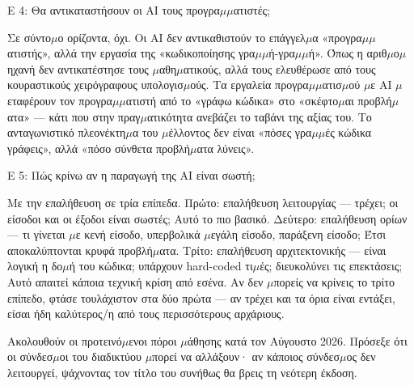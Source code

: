 Ε 4: Θα αντικαταστήσουν οι AI τους προγρα$\mu$$\mu$ατιστές;

Σε σύντο$\mu$ο ορίζοντα, όχι. Οι AI δεν αντικαθιστούν το επάγγελ$\mu$α «προγρα$\mu$$\mu$ατιστής», αλλά την εργασία της «κωδικοποίησης γρα$\mu$$\mu$ή-γρα$\mu$$\mu$ή». Όπως η αριθ$\mu$ο$\mu$ηχανή δεν αντικατέστησε τους $\mu$αθη$\mu$ατικούς, αλλά τους ελευθέρωσε από τους κουραστικούς χειρόγραφους υπολογισ$\mu$ούς. Τα εργαλεία προγρα$\mu$$\mu$ατισ$\mu$ού $\mu$ε AI $\mu$εταφέρουν τον προγρα$\mu$$\mu$ατιστή από το «γράφω κώδικα» στο «σκέφτο$\mu$αι προβλή$\mu$ατα» — κάτι που στην πραγ$\mu$ατικότητα ανεβάζει το ταβάνι της αξίας του. Το ανταγωνιστικό πλεονέκτη$\mu$α του $\mu$έλλοντος δεν είναι «πόσες γρα$\mu$$\mu$ές κώδικα γράφεις», αλλά «πόσο σύνθετα προβλή$\mu$ατα λύνεις».

Ε 5: Πώς κρίνω αν η παραγωγή της AI είναι σωστή;

Με την επαλήθευση σε τρία επίπεδα. Πρώτο: επαλήθευση λειτουργίας — τρέχει; οι είσοδοι και οι έξοδοι είναι σωστές; Αυτό το πιο βασικό. Δεύτερο: επαλήθευση ορίων — τι γίνεται $\mu$ε κενή είσοδο, υπερβολικά $\mu$εγάλη είσοδο, παράξενη είσοδο; Έτσι αποκαλύπτονται κρυφά προβλή$\mu$ατα. Τρίτο: επαλήθευση αρχιτεκτονικής — είναι λογική η δο$\mu$ή του κώδικα; υπάρχουν hard-coded τι$\mu$ές; διευκολύνει τις επεκτάσεις; Αυτό απαιτεί κάποια τεχνική κρίση από εσένα. Αν δεν $\mu$πορείς να κρίνεις το τρίτο επίπεδο, φτάσε τουλάχιστον στα δύο πρώτα — αν τρέχει και τα όρια είναι εντάξει, είσαι ήδη καλύτερος/η από τους περισσότερους αρχάριους.


Ακολουθούν οι προτεινό$\mu$ενοι πόροι $\mu$άθησης κατά τον Αύγουστο 2026. Πρόσεξε ότι οι σύνδεσ$\mu$οι του διαδικτύου $\mu$πορεί να αλλάξουν· αν κάποιος σύνδεσ$\mu$ος δεν λειτουργεί, ψάχνοντας τον τίτλο του συνήθως θα βρεις τη νεότερη έκδοση.

